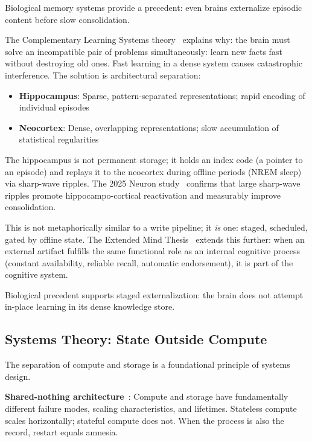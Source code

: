 \documentclass[11pt,letterpaper]{article}
\begin{document}
Biological memory systems provide a precedent: even brains externalize episodic content before slow consolidation.

The Complementary Learning Systems theory~\cite{mcclelland1995} explains why: the brain must solve an incompatible pair of problems simultaneously: learn new facts fast without destroying old ones. Fast learning in a dense system causes catastrophic interference. The solution is architectural separation:

\begin{itemize}[noitemsep]
    \item \textbf{Hippocampus}: Sparse, pattern-separated representations; rapid encoding of individual episodes
    \item \textbf{Neocortex}: Dense, overlapping representations; slow accumulation of statistical regularities
\end{itemize}

The hippocampus is not permanent storage; it holds an index code (a pointer to an episode) and replays it to the neocortex during offline periods (NREM sleep) via sharp-wave ripples. The 2025 Neuron study~\cite{neuron2025} confirms that large sharp-wave ripples promote hippocampo-cortical reactivation and measurably improve consolidation.

This is not metaphorically similar to a write pipeline; it \textit{is} one: staged, scheduled, gated by offline state. The Extended Mind Thesis~\cite{clark1998} extends this further: when an external artifact fulfills the same functional role as an internal cognitive process (constant availability, reliable recall, automatic endorsement), it is part of the cognitive system.

Biological precedent supports staged externalization: the brain does not attempt in-place learning in its dense knowledge store.

\subsection{Systems Theory: State Outside Compute}

The separation of compute and storage is a foundational principle of systems design.

\textbf{Shared-nothing architecture}~\cite{stonebraker1986}: Compute and storage have fundamentally different failure modes, scaling characteristics, and lifetimes. Stateless compute scales horizontally; stateful compute does not. When the process is also the record, restart equals amnesia.
\end{document}
